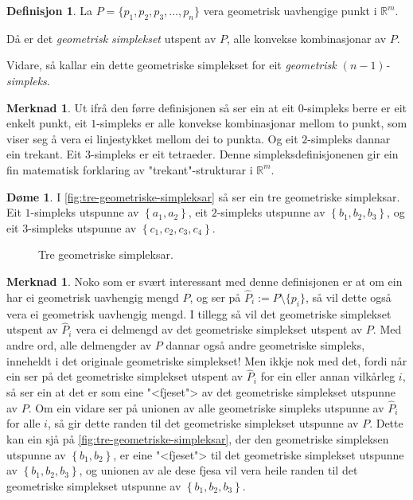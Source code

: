 \documentclass[a4paper, 12pt, norsk]{article}
\theoremstyle{plain}
\theoremstyle{definition}
\newtheorem{definition}[theorem]{Definisjon}
\newtheorem{example}[theorem]{Døme}
\newtheorem{remark}[theorem]{Merknad}
\newcommand{\Rb}{\mathbb{R}}
\newcommand{\set}[1]{ \left\{ #1 \right\} } %
\begin{document}
\begin{definition}
	La $P=\{p_1, p_2, p_3, \dots, p_n\}$ vera geometrisk uavhengige punkt i $\Rb^m$.

	Då er det \emph{geometrisk simplekset} utspent av \( P \), alle konvekse kombinasjonar av $P$.
	
	Vidare, så kallar ein dette geometriske simplekset for eit \emph{geometrisk $(n-1)$-simpleks}.
\end{definition}

\begin{remark}
	Ut ifrå den førre definisjonen så ser ein at eit $0$-simpleks berre er eit enkelt punkt, eit $1$-simpleks er alle konvekse kombinasjonar mellom to punkt, som viser seg å vera ei linjestykket mellom dei to punkta. Og eit $2$-simpleks dannar ein trekant. Eit $3$-simpleks er eit tetraeder. Denne simpleksdefinisjonenen gir ein fin matematisk forklaring av "trekant"-strukturar i $\Rb^m$.
\end{remark}

\begin{example}
	 I \autoref{fig:tre-geometriske-simpleksar} så ser ein tre geometriske simpleksar. Eit \( 1 \)-simpleks utspunne av \( \set{a_1, a_2} \), eit \(2\)-simpleks utspunne av \( \set{b_1, b_2, b_3} \), og eit \(3\)-simpleks utspunne av \( \set{c_1, c_2, c_3, c_4} \).
	\begin{figure}[htbp]
		\begin{center}
			
			\caption{Tre geometriske simpleksar.}
			\label{fig:tre-geometriske-simpleksar}
		\end{center}
	\end{figure}
\end{example}

\begin{remark}
	Noko som er svært interessant med denne definisjonen er at om ein har ei geometrisk uavhengig mengd $P$, og ser på $\hat{P}_i := P \setminus \{p_i\}$, så vil dette også vera ei geometrisk uavhengig mengd. I tillegg så vil det geometriske simplekset utspent av $\hat{P}_i$ vera ei delmengd av det geometriske simplekset utspent av $P$. Med andre ord, alle delmengder av $P$ dannar også andre geometriske simpleks, inneheldt i det originale geometriske simplekset! Men ikkje nok med det, fordi når ein ser på det geometriske simplekset utspent av $\hat{P}_i$ for ein eller annan vilkårleg $i$, så ser ein at det er som eine "<fjeset"> av det geometriske simplekset utspunne av $P$. Om ein vidare ser på unionen av alle geometriske simpleks utspunne av \( \hat{P}_i \) for alle \( i \), så gir dette randen til det geometriske simplekset utspunne av \( P \). Dette kan ein sjå på \autoref{fig:tre-geometriske-simpleksar}, der den geometriske simpleksen utspunne av \( \set{b_1, b_2} \), er eine "<fjeset"> til det geometriske simplekset utspunne av \( \set{b_1, b_2, b_3} \), og unionen av ale dese fjesa vil vera heile randen til det geometriske simplekset utspunne av \( \set{b_1, b_2, b_3} \).
\end{remark}
\end{document}
